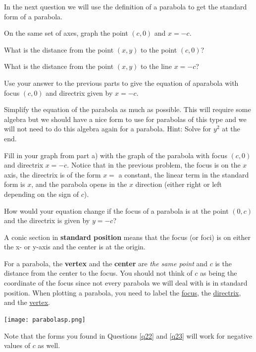 In the next question we will use the definition of a parabola to get the standard form of a parabola.

\begin{annotation}
\end{annotation}

\bq\label{q22} \be
\item On the same set of axes, graph the point $(c,0)$ and $x=-c$.
\item What is the distance from the point $(x,y)$ to the point $(c,0)$?
\item What is the distance from the point $(x,y)$ to the line $x=-c$?
\item Use your answer to the previous parts to give the equation of a\break parabola with focus $(c,0)$ and directrix given by $x= -c$.
\item Simplify the equation of the parabola as much as possible. This will require some algebra but we should have a nice form to use for parabolas of this type and we will not need to do this algebra again for a parabola. Hint: Solve for $y^2$ at the end.
\item Fill in your graph from part a) with the graph of the parabola with focus $(c,0)$ and directrix $x= -c$.
\ee \eq
Notice that in the previous problem, the focus is on the $x$ axis, the directrix is of the form $x=$ a constant, the linear term in the standard form is $x$, and the parabola opens in the $x$ direction (either right or left depending on the sign of $c$).

\question\label{q23} How would your equation change if the focus of a parabola is at the point $(0,c)$ and the directrix is given by $y=-c$?

\begin{info} A conic section in \textbf{standard position} means that the focus (or foci) is on either the x- or y-axis and the center is at the origin.

For a parabola, the \textbf{vertex} and the \textbf{center} are \emph{the same point} and $c$ is the distance from the center to the focus. You should not think of $c$ as being the coordinate of the focus since not every parabola we will deal with is in standard position. When plotting a parabola, you need to label the \underline{focus}, the \underline{directrix}, and the \underline{vertex}.

\begin{center} \texttt{[image: parabolasp.png]} \end{center}

Note that the forms you found in Questions \ref{q22} and \ref{q23} will work for negative values of $c$ as well.
\end{info}

